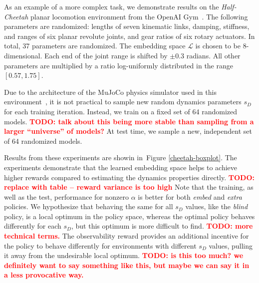 \documentclass{article}
\newcommand{\TODO}[1]{\textcolor{red}{\textbf{TODO: #1}}}
\newcommand{\cL}{\mathcal{L}}
\newcommand{\blind}{\emph{blind}}
\newcommand{\extra}{\emph{extra}}
\newcommand{\embed}{\emph{embed}}
\newcommand{\latent}{\cL}
\newcommand{\figref}[1]{Figure \ref{#1}}
\begin{document}
As an example of a more complex task, we demonstrate results on the \emph{Half-Cheetah}
planar locomotion environment from the OpenAI Gym~\citep{openai-gym}.
The following parameters are randomized:
lengths of seven kinematic links,
damping, stiffness, and ranges of six planar revolute joints,
and gear ratios of six rotary actuators.
In total, 37 parameters are randomized.
The embedding space $\latent$ is chosen to be 8-dimensional.
Each end of the joint range is shifted by $\pm 0.3$ radians.
All other parameters are multiplied by a ratio log-uniformly distributed in the range $[0.57, 1.75]$.

Due to the architecture of the MuJoCo physics simulator used in this environment~\citep{todorov-mujoco},
it is not practical to sample new random dynamics parameters $s_D$ for each training iteration.
Instead, we train on a fixed set of 64 randomized models.
\TODO{talk about this being more stable than sampling from a larger ``universe'' of models?}
At test time, we sample a new, independent set of 64 randomized models.

Results from these experiments are showin in~\figref{cheetah-boxplot}.
The experiments demonstrate that the learned embedding space helps to achieve higher rewards
compared to estimating the dynamics properties directly.
\TODO{replace with table -- reward variance is too high}
Note that the training, as well as the test, performance for nonzero $\alpha$
is better for both \embed{} and \extra{} policies.
We hypothesize that behaving the same for all $s_D$ values, like the \blind{} policy,
is a local optimum in the policy space,
whereas the optimal policy behaves differently for each $s_D$,
but this optimum is more difficult to find. \TODO{more technical terms.}
The observability reward provides an additional incentive
for the policy to behave differently for environments with different $s_D$ values,
pulling it away from the undesirable local optimum.
\TODO{is this too much? we definitely want to say something like this,
but maybe we can say it in a less provocative way.}
\end{document}
